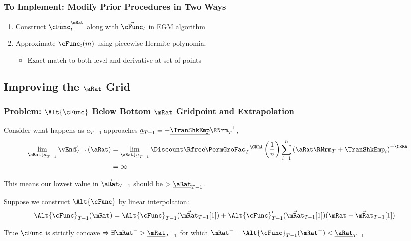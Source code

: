 \documentclass{beamer}
\begin{document}
\begin{frame}
\frametitle{To Implement: Modify Prior Procedures in Two Ways}
\begin{enumerate}
\item Construct $\vec{\cFunc}^{\mRat}_{t}$ along with $\vec{\cFunc}_{t}$ in EGM algorithm
\item Approximate $\cFunc_{t}(m)$ using piecewise Hermite polynomial
\begin{itemize}
\item Exact match to both level and derivative at set of points
\end{itemize}
\end{enumerate}
\end{frame}


\subsection{Improving the $\aRat$ Grid}

\begin{frame}
\frametitle{Problem: $\Alt{\cFunc}$ Below Bottom $\mRat$ Gridpoint and Extrapolation}

Consider what happens as ${a}_{T-1}$ approaches $\underline{a}_{T-1}\equiv-\underline{\TranShkEmp}\RNrm_{T}^{-1}$,
\begin{equation*}\begin{gathered}\begin{aligned}
        \lim_{{\aRat} \downarrow \underline{a}_{T-1}} \vEnd_{T-1}^{\prime}({\aRat}) 
& =         \lim_{{\aRat} \downarrow \underline{a}_{T-1}} \Discount \Rfree \PermGroFac_{T}^{-\CRRA} \left(\frac{1}{n}\right) \sum_{i=1}^{n} \left( {\aRat} \RNrm_{T}+ \TranShkEmp_{i}\right)^{-\CRRA}
\\  & = \infty
\end{aligned}\end{gathered}\end{equation*}

This means our lowest value in $\vec{\aRat}_{T-1}$ should be $> \underline{\aRat}_{T-1}$.  

\medskip
Suppose we construct $\Alt{\cFunc}$ by linear interpolation:
\begin{equation*}\begin{gathered}\begin{aligned}
  \Alt{\cFunc}_{T-1}(\mRat)  & = \Alt{\cFunc}_{T-1}(\vec{\mRat}_{T-1}[1])+\Alt{\cFunc}_{T-1}^{\prime}(\vec{\mRat}_{T-1}[1])({\mRat}-\vec{\mRat}_{T-1}[1]) \label{eq:ExtrapLin}
\end{aligned}\end{gathered}\end{equation*}

True $\cFunc$ is strictly concave 
$\Rightarrow \exists \mRat^{-} > \underline{\mRat}_{T-1}$  for which $\mRat^{-}-\Alt{\cFunc}_{T-1}(\mRat^{-}) < \underline{\aRat}_{T-1}$

\end{frame}
\end{document}
